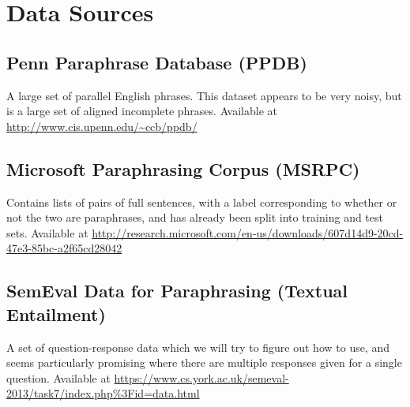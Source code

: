 \documentclass[11pt, reqno]{amsart}
\begin{document}
	\section{Data Sources}
	\subsection{ Penn Paraphrase Database (PPDB)} 
	A large set of parallel English phrases. This dataset appears to be very noisy, but is a large set of aligned incomplete phrases.
	Available at \url{http://www.cis.upenn.edu/~ccb/ppdb/} 
		
	\subsection{Microsoft Paraphrasing Corpus (MSRPC) }
	Contains lists of pairs of full sentences, with a label corresponding to whether or not the two are paraphrases, and has already been split into training and test sets.
	Available at \url{http://research.microsoft.com/en-us/downloads/607d14d9-20cd-47e3-85bc-a2f65cd28042} 
	
	\subsection{SemEval Data for Paraphrasing (Textual Entailment) } A set of question-response data which we will try to figure out how to use, and seems particularly promising where there are multiple responses given for a single question. 	
	Available at \url{https://www.cs.york.ac.uk/semeval-2013/task7/index.php%3Fid=data.html}
		
\end{document}
